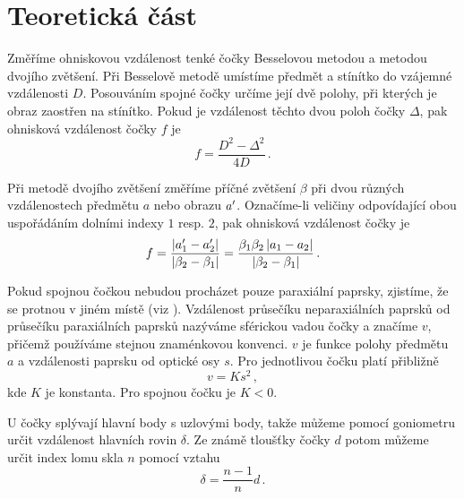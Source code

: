 \section*{Teoretická část}
Změříme ohniskovou vzdálenost tenké čočky Besselovou metodou a metodou dvojího zvětšení.
Při Besselově metodě umístíme předmět a stínítko do vzájemné vzdálenosti $D$. Posouváním spojné čočky určíme její dvě polohy, při kterých je obraz zaostřen na stínítko. Pokud je vzdálenost těchto dvou poloh čočky $\Delta$, pak ohnisková vzdálenost čočky $f$ je \cite{skripta}
\begin{equation}\label{e:bessel}
f=\frac{D^2-\Delta^2}{4D} \,.
\end{equation}

Při metodě dvojího zvětšení změříme příčné zvětšení $\beta$ při dvou různých vzdálenostech předmětu $a$ nebo obrazu $a^\prime$. Označíme-li veličiny odpovídající obou uspořádáním dolními indexy $1$ resp. $2$, pak ohnisková vzdálenost čočky je \cite{skripta}
\begin{equation}\label{e:dvojizvetseni}
f=\frac{\left|a^\prime_1-a^\prime_2\right|}{\left|\beta_2-\beta_1\right|}=\frac{\beta_1 \beta_2 \left|a_1-a_2\right|}{\left|\beta_2-\beta_1\right|} \,.
\end{equation}


Pokud spojnou čočkou nebudou procházet pouze paraxiální paprsky, zjistíme, že se protnou v jiném místě (viz \cite{skripta}). Vzdálenost průsečíku neparaxiálních paprsků od průsečíku paraxiálních paprsků nazýváme sférickou vadou čočky a značíme $v$, přičemž používáme stejnou znaménkovou konvenci. $v$ je funkce polohy předmětu $a$ a vzdálenosti paprsku od optické osy $s$. Pro jednotlivou čočku platí přibližně \cite{skripta}
\begin{equation} \label{e:sf_chyba}
v=Ks^2 \,,
\end{equation}
kde $K$ je konstanta. Pro spojnou čočku je $K<0$.


U čočky splývají hlavní body s uzlovými body, takže můžeme pomocí goniometru určit vzdálenost hlavních rovin $\delta$.
Ze známě tloušťky čočky $d$ potom můžeme určit index lomu skla $n$ pomocí vztahu \cite{skripta}
\begin{equation} \label{e:tlusta}
\delta = \frac{n-1}{n} d \,.
\end{equation}